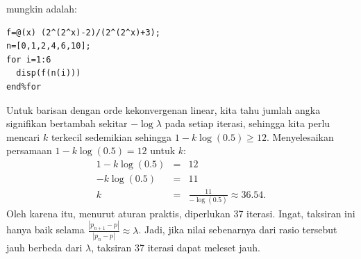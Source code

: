 \begin{description}
mungkin adalah: \begin{verbatim}
f=@(x) (2^(2^x)-2)/(2^(2^x)+3);
n=[0,1,2,4,6,10];
for i=1:6
  disp(f(n(i)))
end%for
\end{verbatim}
\item [{\ref{exc:convergence-12}:}] Untuk barisan dengan orde kekonvergenan
linear, kita tahu jumlah angka signifikan bertambah sekitar $-\log\lambda$
pada setiap iterasi, sehingga kita perlu mencari $k$ terkecil sedemikian
sehingga $1-k\log(0.5)\geq12$. Menyelesaikan persamaan $1-k\log(0.5)=12$
untuk $k$:
\begin{eqnarray*}
1-k\log(0.5) & = & 12\\
-k\log(0.5) & = & 11\\
k & = & \frac{11}{-\log(0.5)}\approx36.54.
\end{eqnarray*}
Oleh karena itu, menurut aturan praktis, diperlukan 37 iterasi. Ingat,
taksiran ini hanya baik selama $\frac{|p_{n+1}-p|}{|p_{n}-p|}\approx\lambda$.
Jadi, jika nilai sebenarnya dari rasio tersebut jauh berbeda dari
$\lambda$, taksiran 37 iterasi dapat meleset jauh.
\end{description}

